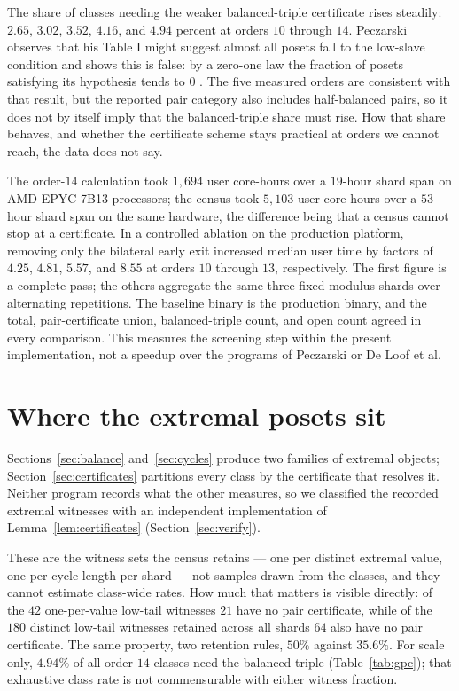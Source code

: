 \documentclass[11pt]{article}
\theoremstyle{definition}
\begin{document}
The share of classes needing the weaker balanced-triple certificate rises
steadily: $2.65$, $3.02$, $3.52$, $4.16$, and $4.94$ percent at orders $10$
through $14$.  Peczarski observes that his Table I might suggest almost all
posets fall to the low-slave condition and shows this is false: by a zero-one
law the fraction of posets satisfying its hypothesis tends to $0$
\cite[p.~94]{peczarski-gold}.  The five measured orders are consistent with
that result, but the reported pair category also includes half-balanced pairs,
so it does not by itself imply that the balanced-triple share must rise.  How
that share behaves, and whether the certificate scheme stays practical at
orders we cannot reach, the data does not say.

The order-$14$ calculation took $1{,}694$ user core-hours over a $19$-hour
shard span on AMD EPYC 7B13 processors; the census took $5{,}103$ user
core-hours over a $53$-hour shard span on the same hardware, the difference
being that a census cannot stop at a certificate.  In a controlled ablation on
the production platform, removing only the bilateral early exit increased
median user time by factors of $4.25$, $4.81$, $5.57$, and $8.55$ at orders
$10$ through $13$, respectively.  The first figure is a complete pass; the others
aggregate the same three fixed modulus shards over alternating repetitions.
The baseline binary is the production binary, and the total, pair-certificate
union, balanced-triple count, and open count agreed in every comparison.  This
measures the screening step within the present implementation, not a speedup
over the programs of Peczarski or De Loof et al.

\section{Where the extremal posets sit}\label{sec:meet}

Sections~\ref{sec:balance} and~\ref{sec:cycles} produce two families of
extremal objects; Section~\ref{sec:certificates} partitions every class by the
certificate that resolves it.  Neither program records what the other
measures, so we classified the recorded extremal witnesses with an independent
implementation of Lemma~\ref{lem:certificates} (Section~\ref{sec:verify}).

These are the witness sets the census retains --- one per distinct extremal
value, one per cycle length per shard --- not samples drawn from the classes,
and they cannot estimate class-wide rates.  How much that matters is visible
directly: of the $42$ one-per-value low-tail witnesses $21$ have no pair
certificate, while of the $180$ distinct low-tail witnesses retained across
all shards $64$ also have no pair certificate.  The same property, two
retention rules, $50\%$ against $35.6\%$.  For scale only, $4.94\%$ of all
order-$14$ classes need the balanced triple (Table~\ref{tab:gpc}); that
exhaustive class rate is not commensurable with either witness fraction.
\end{document}
